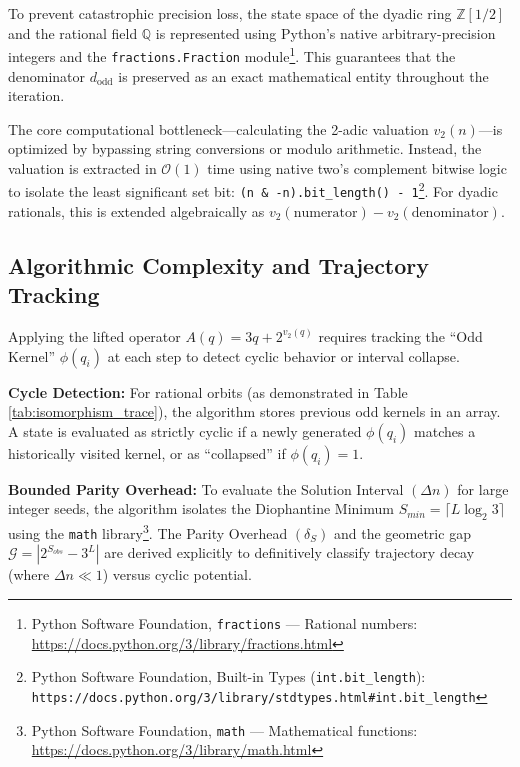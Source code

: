 \documentclass[11pt, a4paper]{article}
\theoremstyle{definition}
\begin{document}
To prevent catastrophic precision loss, the state space of the dyadic ring $\mathbb{Z}[1/2]$ and the rational field $\mathbb{Q}$ is represented using Python's native arbitrary-precision integers and the \texttt{fractions.Fraction} module\footnote{Python Software Foundation, \texttt{fractions} --- Rational numbers: \url{https://docs.python.org/3/library/fractions.html}}. This guarantees that the denominator $d_{\text{odd}}$ is preserved as an exact mathematical entity throughout the iteration.

The core computational bottleneck---calculating the 2-adic valuation $v_{2}(n)$---is optimized by bypassing string conversions or modulo arithmetic. Instead, the valuation is extracted in $\mathcal{O}(1)$ time using native two's complement bitwise logic to isolate the least significant set bit: \texttt{(n \& -n).bit\_length() - 1}\footnote{Python Software Foundation, Built-in Types (\texttt{int.bit\_length}): \texttt{https://docs.python.org/3/library/stdtypes.html\#int.bit\_length}}. For dyadic rationals, this is extended algebraically as $v_2(\text{numerator}) - v_2(\text{denominator})$.

\subsection{Algorithmic Complexity and Trajectory Tracking}
Applying the lifted operator $A(q) = 3q + 2^{v_{2}(q)}$ requires tracking the ``Odd Kernel'' $\phi(q_i)$ at each step to detect cyclic behavior or interval collapse.

\textbf{Cycle Detection:} For rational orbits (as demonstrated in Table \ref{tab:isomorphism_trace}), the algorithm stores previous odd kernels in an array. A state is evaluated as strictly cyclic if a newly generated \(\phi(q_i)\) matches a historically visited kernel, or as ``collapsed'' if \(\phi(q_i) = 1\).

\textbf{Bounded Parity Overhead:} To evaluate the Solution Interval $(\Delta n)$ for large integer seeds, the algorithm isolates the Diophantine Minimum $S_{min} = \lceil L \log_2 3 \rceil$ using the \texttt{math} library\footnote{Python Software Foundation, \texttt{math} --- Mathematical functions: \url{https://docs.python.org/3/library/math.html}}. The Parity Overhead $(\delta_S)$ and the geometric gap $\mathcal{G} = |2^{S_{obs}} - 3^L|$ are derived explicitly to definitively classify trajectory decay (where $\Delta n \ll 1$) versus cyclic potential.
\end{document}
